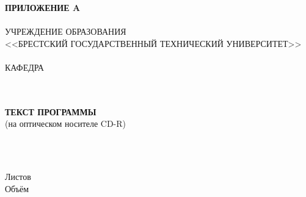 \begin{center}
    \hspace{.6\textwidth}\textbf{ПРИЛОЖЕНИЕ A}\\
    \hspace{0pt}\\
    УЧРЕЖДЕНИЕ ОБРАЗОВАНИЯ\\
    <<БРЕСТСКИЙ ГОСУДАРСТВЕННЫЙ ТЕХНИЧЕСКИЙ УНИВЕРСИТЕТ>>\\
    \hspace{0pt}\\
    КАФЕДРА \titlePageKafedra\\
\end{center}

\vfill

\begin{center}
    \titlePageTopic\\
    \hspace{0pt}\\
    \textbf{ТЕКСТ ПРОГРАММЫ}\\
    (на оптическом носителе CD-R)
\end{center}

\vfill

\begin{center}
    \codeA\\
    \hspace{0pt}\\
    \begin{flushright}
        \begin{minipage}[t]{.5\textwidth}
            Листов \pageref{LastPage}\\
            Объём \diskVolume
        \end{minipage}
    \end{flushright}
\end{center}

\vfill

